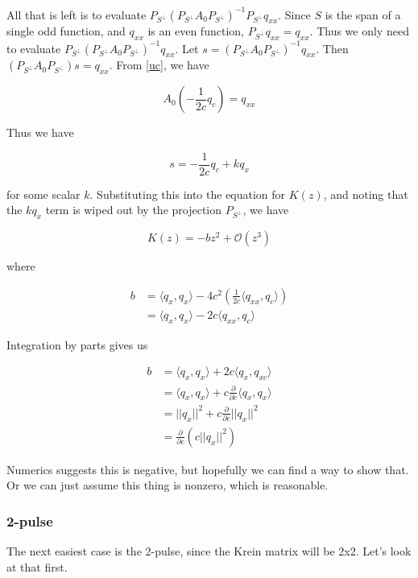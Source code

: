 \documentclass[12pt]{article}
\begin{document}
All that is left is to evaluate $P_{S^\perp} (P_{S^\perp} A_0 P_{S^\perp})^{-1} P_{S^\perp} q_{xx}$. Since $S$ is the span of a single odd function, and $q_{xx}$ is an even function, $P_{S^\perp} q_{xx} = q_{xx}$. Thus we only need to evaluate $P_{S^\perp} (P_{S^\perp} A_0 P_{S^\perp})^{-1} q_{xx}$. Let $s = (P_{S^\perp} A_0 P_{S^\perp})^{-1} q_{xx}$. Then $(P_{S^\perp} A_0 P_{S^\perp}) s = q_{xx}$. From \eqref{uc}, we have

\begin{equation*}\label{uc}
A_0 \left( -\frac{1}{2c} q_c \right) = q_{xx}
\end{equation*}

Thus we have

\[
s = -\frac{1}{2c} q_c + k q_x
\]

for some scalar $k$. Substituting this into the equation for $K(z)$, and noting that the $k q_x$ term is wiped out by the projection $P_{S^\perp}$, we have

\[
K(z) = -b z^2 + \mathcal{O}(z^3)
\]

where

\begin{align*}
b &= \langle q_x, q_x \rangle - 4 c^2 \left(\frac{1}{2c} \langle q_{xx}, q_c \rangle \right)  \\
&= \langle q_x, q_x \rangle - 2 c \langle q_{xx}, q_c \rangle
\end{align*}

Integration by parts gives us

\begin{align*}
b &= \langle q_x, q_x \rangle + 2c \langle q_{x}, q_{xc} \rangle  \\
&= \langle q_x, q_x \rangle + c \frac{\partial}{\partial c}\langle q_x, q_x \rangle \\
&= ||q_x||^2 + c \frac{\partial}{\partial c}||q_x||^2 \\
&= \frac{\partial}{\partial c} \left( c||q_x||^2 \right)
\end{align*}

Numerics suggests this is negative, but hopefully we can find a way to show that. Or we can just assume this thing is nonzero, which is reasonable.

\subsubsection{2-pulse}

The next easiest case is the 2-pulse, since the Krein matrix will be 2x2. Let's look at that first. \\
\end{document}
